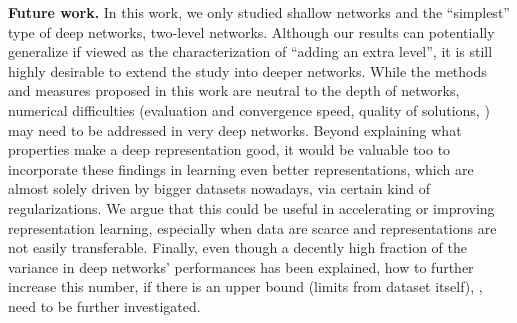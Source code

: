 \documentclass[10pt,twocolumn,letterpaper]{article}
\begin{document}
{\bf Future work.} In this work, we only studied shallow networks and the ``simplest'' type of deep networks, two-level networks.
Although our results can potentially generalize if viewed as the characterization of ``adding an extra level'', it is still highly desirable to extend the study into deeper networks.
While the methods and measures proposed in this work are neutral to the depth of networks, numerical difficulties (\eg evaluation and convergence speed, quality of solutions, \etc) may need to be addressed in very deep networks.
Beyond explaining what properties make a deep representation good, it would be valuable too to incorporate these findings in learning even better representations, which are almost solely driven by bigger datasets nowadays, via certain kind of regularizations.  
We argue that this could be useful in accelerating or improving representation learning, especially when data are scarce and representations are not easily transferable.
Finally, even though a decently high fraction of the variance in deep networks' performances has been explained, how to further increase this number, if there is an upper bound (\eg limits from dataset itself), \etc, need to be further investigated.




{\small


}
\end{document}
